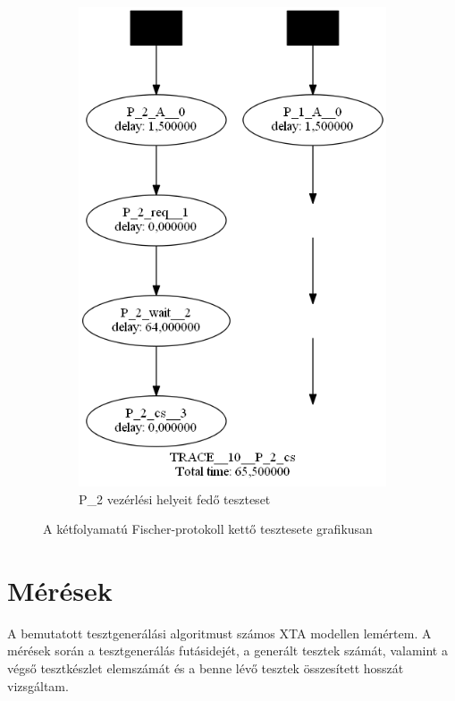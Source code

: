 \begin{figure}
\begin{subfigure}[b]{0.4\textwidth}
         \includegraphics[width=\textwidth]{src/figures/fischer-test2.png}
         \caption{P\_2 vezérlési helyeit fedő teszteset}
         \label{fig:fischer-test2}
     \end{subfigure}
        \caption{A kétfolyamatú Fischer-protokoll kettő tesztesete grafikusan}
        \label{fig:fischer-tests}
\end{figure}

\section{Mérések} \label{meresek}

A bemutatott tesztgenerálási algoritmust számos XTA modellen lemértem. A mérések során a tesztgenerálás futásidejét, a generált tesztek számát, valamint a végső tesztkészlet elemszámát és a benne lévő tesztek összesített hosszát vizsgáltam.

